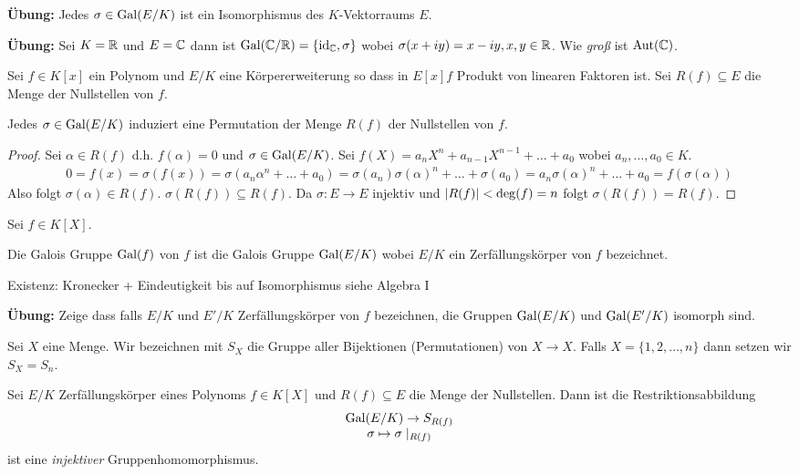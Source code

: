 \textbf{Übung:} Jedes $\sigma \in \operatorname{Gal}(E / K)$ ist ein Isomorphismus des $K$-Vektorraums $E$.

\textbf{Übung:} Sei $K = \mathbb{R}$ und $E = \mathbb{C}$ dann ist $\operatorname{Gal}(\mathbb{C} / \mathbb{R}) = \{\operatorname{id}_{\mathbb{C}}, \sigma\} $ wobei $\sigma(x+iy) = x-iy, x,y \in \mathbb{R}$.
Wie \emph{groß} ist $\operatorname{Aut}(\mathbb{C})$.

Sei $f \in K[x]$ ein Polynom und $E / K $ eine Körpererweiterung so dass in $E[x] f$ Produkt von linearen Faktoren ist.
Sei $R(f) \subseteq E$ die Menge der Nullstellen von $f$.

\begin{lemma}
	Jedes $\sigma \in \operatorname{Gal}(E / K)$ induziert eine Permutation der Menge $R(f)$ der Nullstellen von $f$.
\end{lemma}

\begin{proof}
	Sei $\alpha \in R(f)$ d.h. $f(\alpha) = 0$ und $\sigma \in \operatorname{Gal}(E / K)$.
	Sei $f(X) = a_{n} X^{n} + a_{n-1} X^{n-1} + \ldots + a_0$ wobei $a_{n},\ldots,a_0 \in K$.
	\begin{align*}
		0 = f(x) = \sigma(f(x)) = \sigma(a_{n} \alpha^{n} + \ldots + a_0) = \sigma(a_{n}) \sigma(\alpha)^{n} + \ldots + \sigma(a_0) 
		= a_{n} \sigma(\alpha)^{n} + \ldots + a_0 = f(\sigma(\alpha))
	\end{align*}
	Also folgt $\sigma(\alpha) \in R(f)$.
	$\sigma(R(f)) \subseteq R(f)$. Da $\sigma: E \to E$ injektiv und $\abs{R(f)} < \deg(f) = n$ folgt $\sigma(R(f)) = R(f)$.
\end{proof}

Sei $f \in K[X]$.
\begin{definition}
	Die Galois Gruppe $\operatorname{Gal}(f)$ von $f$ ist die Galois Gruppe $\operatorname{Gal}(E / K)$ wobei $E / K$ ein Zerfällungskörper
	von $f$ bezeichnet.
\end{definition}
Existenz: Kronecker + Eindeutigkeit bis auf Isomorphismus siehe Algebra I

\textbf{Übung:} Zeige dass falls $E / K$ und $E' / K$ Zerfällungskörper von $f$ bezeichnen, die Gruppen
$\operatorname{Gal}(E / K)$ und $\operatorname{Gal}(E'/K)$ isomorph sind.

\begin{notation}
	Sei $X$ eine Menge. Wir bezeichnen mit $S_{X}$ die Gruppe aller Bijektionen (Permutationen) von $X \to X$.
	Falls $X = \{1,2,\ldots,n\}$ dann setzen wir $S_{X} = S_{n}$.
\end{notation}

\begin{lemma}
	Sei $E / K$ Zerfällungskörper eines Polynoms $f \in K[X]$ und $R(f) \subseteq E$ die Menge der Nullstellen.
	Dann ist die Restriktionsabbildung 
	\[
		\begin{array}{c} \operatorname{Gal}(E / K) \to S_{R(f)}\\ \sigma \mapsto  \sigma \mid_{R(f)}\\ \end{array}
	\] 
	ist eine \emph{injektiver} Gruppenhomomorphismus.
\end{lemma}

